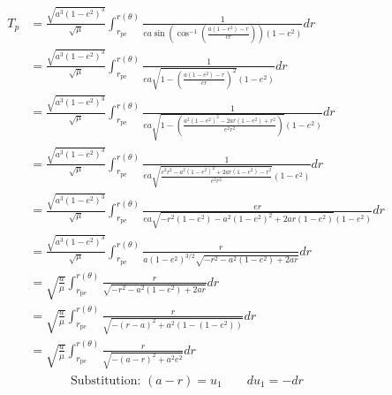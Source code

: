 \documentclass[../main.tex]{subfiles}
\begin{document}
\begin{align*}
    T_p & =\frac{\sqrt{a^3(1-e^2)^3}}{\sqrt{\mu}}\int_{r_\text{pe}}^{r(\theta)}\frac{1}{ea\sin\left(\cos^{-1}\left(\frac{a(1-e^2)-r}{er}\right)\right)(1-e^2)}dr                                                         \\
        & =\frac{\sqrt{a^3(1-e^2)^3}}{\sqrt{\mu}}\int_{r_\text{pe}}^{r(\theta)}\frac{1}{ea\sqrt{1-\left(\frac{a(1-e^2)-r}{er}\right)^2}(1-e^2)}dr                                                                        \\
        & =\frac{\sqrt{a^3(1-e^2)^3}}{\sqrt{\mu}}\int_{r_\text{pe}}^{r(\theta)}\frac{1}{ea\sqrt{1-\left(\frac{a^2(1-e^2)^2-2ar(1-e^2)+r^2}{e^2r^2}\right)}(1-e^2)}dr                                                     \\
        & =\frac{\sqrt{a^3(1-e^2)^3}}{\sqrt{\mu}}\int_{r_\text{pe}}^{r(\theta)}\frac{1}{ea\sqrt{\frac{e^2r^2-a^2(1-e^2)^2+2ar(1-e^2)-r^2}{e^2r^2}}(1-e^2)}dr                                                             \\
        & =\frac{\sqrt{a^3(1-e^2)^3}}{\sqrt{\mu}}\int_{r_\text{pe}}^{r(\theta)}\frac{er}{ea\sqrt{-r^2(1-e^2)-a^2(1-e^2)^2+2ar(1-e^2 )}(1-e^2)}dr                                                                         \\
        & =\frac{\sqrt{a^3(1-e^2)^3}}{\sqrt{\mu}}\int_{r_\text{pe}}^{r(\theta)}\frac{r}{a(1-e^2)^{3/2}\sqrt{-r^2-a^2(1-e^2)+2ar}}dr                                                                                      \\
        & =\sqrt{\frac{a}{\mu}}\int_{r_\text{pe}}^{r(\theta)}\frac{r}{\sqrt{-r^2-a^2(1-e^2)+2ar}}dr                                                                                                                      \\
        & =\sqrt{\frac{a}{\mu}}\int_{r_\text{pe}}^{r(\theta)}\frac{r}{\sqrt{-(r-a)^2+a^2(1-(1-e^2))}}dr                                                                                                                  \\
        & =\sqrt{\frac{a}{\mu}}\int_{r_\text{pe}}^{r(\theta)}\frac{r}{\sqrt{-(a-r)^2+a^2e^2}}dr                                                                                                                          \\
        & \phantom{=}\qquad{}\text{Substitution: }(a-r)=u_1\qquad{}du_1=-dr                                                                                                                                              \\

\end{align*}
\end{document}
